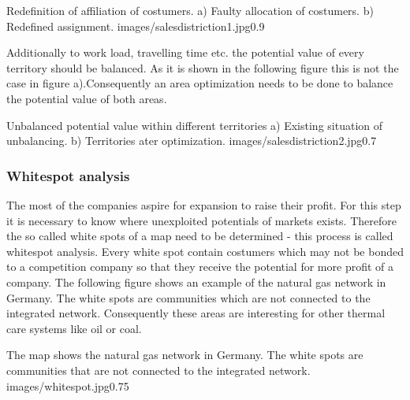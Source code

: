 \begin{figurevarSize}{Redefinition of affiliation of costumers. a) Faulty allocation of costumers. b) Redefined assignment. \cite{zimtec}}{images/salesdistriction1.jpg}{0.9}\end{figurevarSize} 

Additionally to work load, travelling time etc. the potential value of every territory should be balanced. As it is shown in the following figure this is not the case in figure a).Consequently an area optimization needs to be done to balance the potential value of both areas.

\begin{figurevarSize}{Unbalanced potential value within different territories a) Existing situation of unbalancing. b) Territories ater optimization. \cite{zimtec}}{images/salesdistriction2.jpg}{0.7}\end{figurevarSize} 

\subsubsection{Whitespot analysis}
The most of the companies aspire for expansion to raise their profit. For this step it is necessary to know where unexploited potentials of markets exists. Therefore the so called white spots of a map need to be determined - this process is called whitespot analysis. Every white spot contain costumers which may not be bonded to a competition company so that they receive the potential for more profit of a company. The following figure shows an example of the natural gas network in Germany. The white spots are communities which are not connected to the integrated network. Consequently these areas are interesting for other thermal care systems like oil or coal. 

\begin{figurevarSize}{The map shows the natural gas network in Germany. The white spots are communities that are not connected to the integrated network. \cite{tappert}}{images/whitespot.jpg}{0.75}\end{figurevarSize} 